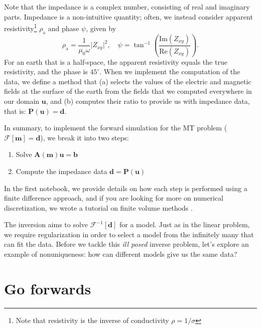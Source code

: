 \documentclass[11pt,oneside]{article}
\begin{document}
Note that the impedance is a complex number, consisting of real and imaginary parts. Impedance is a non-intuitive quantity; often, we instead consider apparent resistivity\footnote{Note that resistivity is the inverse of conductivity $\rho = 1/\sigma$} $\rho_\mathrm{a}$ and phase $\psi$, given by
\begin{equation}
\rho_\mathrm{a} = \frac{1}{\mu_0\omega} \big|Z_{xy}\big|^2,
\quad
\psi = \tan^{-1}\left(\frac{\text{Im}(Z_{xy})}{\text{Re}(Z_{xy})}\right).
\label{eq:rhoa_phase}
\end{equation}
For an earth that is a half-space, the apparent resistivity equals the true resistivity, and the phase is $45^{\circ}$. When we implement the computation of the data, we define a method that (a) selects the values of the electric and magnetic fields at the surface of the earth from the fields that we computed everywhere in our domain $\mathbf{u}$, and (b) computes their ratio to provide us with impedance data, that is:  $\mathbf{P}(\mathbf{u}) = \mathbf{d}$.


In summary, to implement the forward simulation for the MT problem ($\mathcal{F}[\mathbf{m}] = \mathbf{d}$), we break it into two steps:
\begin{enumerate}
     \item Solve $\mathbf{A}(\mathbf{m})\mathbf{u} = \mathbf{b}$
    \item Compute the impedance data $\mathbf{d} = \mathbf{P}(\mathbf{u})$
\end{enumerate}
In the first notebook, we provide details on how each step is performed using a finite difference approach, and if you are looking for more on numerical discretization, we wrote a tutorial on finite volume methods \citep{Cockett2016}.

The inversion aims to solve $\mathcal{F}^{-1}[\mathbf{d}]$ for a model. Just as in the linear problem, we require regularization in order to select a model from the infinitely many that can fit the data. Before we tackle this \emph{ill posed} inverse problem, let's explore an example of nonuniqueness: how can different models give us the same data?

\section{Go forwards}
\end{document}
